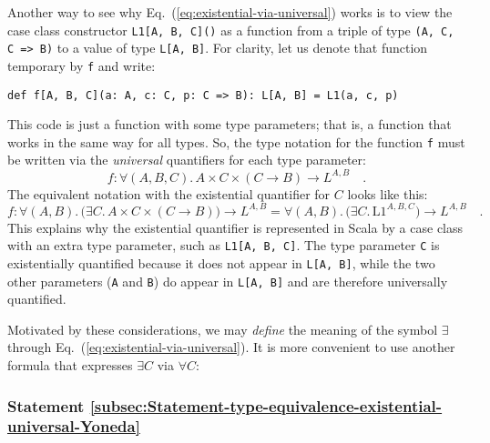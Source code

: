 Another way to see why Eq.~(\ref{eq:existential-via-universal})
works is to view the case class constructor \lstinline!L1[A, B, C]()!
as a function from a triple of type \lstinline!(A, C, C => B)!
to a value of type \lstinline!L[A, B]!.
For clarity, let us denote that function temporary by \lstinline!f!
and write:
\begin{lstlisting}
def f[A, B, C](a: A, c: C, p: C => B): L[A, B] = L1(a, c, p) 
\end{lstlisting}
This code is just a function with some type parameters; that is, a
function that works in the same way for all types. So, the type notation
for the function \lstinline!f!
must be written via the \emph{universal} quantifiers for each type
parameter:
\[
f:\forall(A,B,C).\,A\times C\times(C\rightarrow B)\rightarrow L^{A,B}\quad.
\]
The equivalent notation with the existential quantifier for $C$ looks
like this:
\[
f:\forall(A,B).\,\big(\exists C.\,A\times C\times(C\rightarrow B)\big)\rightarrow L^{A,B}=\forall(A,B).\,\big(\exists C.\,\text{L1}^{A,B,C})\rightarrow L^{A,B}\quad.
\]
This explains why the existential quantifier is represented in Scala
by a case class with an extra type parameter, such as \lstinline!L1[A, B, C]!.
The type parameter \lstinline!C!
is existentially quantified because it does not appear in \lstinline!L[A, B]!,
while the two other parameters (\lstinline!A!
and \lstinline!B!) do appear
in \lstinline!L[A, B]!
and are therefore universally quantified.

Motivated by these considerations, we may \emph{define} the meaning
of the symbol $\exists$ through Eq.~(\ref{eq:existential-via-universal}).
It is more convenient to use another formula that expresses $\exists C$
via $\forall C$:

\subsubsection{Statement \label{subsec:Statement-type-equivalence-existential-universal-Yoneda}\ref{subsec:Statement-type-equivalence-existential-universal-Yoneda}}

